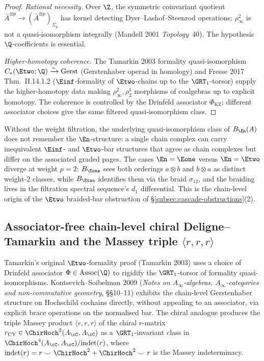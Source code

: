 \begin{proof}
\emph{Rational necessity.} Over $\Z$, the symmetric coinvariant quotient $\bar A^{\otimes p} \to (\bar A^{\otimes p})_{\Sigma_p}$ has kernel detecting Dyer--Lashof--Steenrod operations; $\rho_\infty^2$ is not a quasi-isomorphism integrally (Mandell 2001 \emph{Topology}~40). The hypothesis $\Q$-coefficients is essential.

\emph{Higher-homotopy coherence.} The Tamarkin 2003 formality quasi-isomorphism $C_*(\Etwo; \Q) \xrightarrow{\sim} \Gerst$ (Gerstenhaber operad in homology) and Fresse 2017 Thm.~II.14.1.2 ($\Einf$-formality of $\Etwo$-chains up to the $\GRT_1$-torsor) supply the higher-homotopy data making $\rho_\infty^2, \rho_2^1$ morphisms of coalgebras up to explicit homotopy. The coherence is controlled by the Drinfeld associator $\Phi_{\mathrm{KZ}}$; different associator choices give the same filtered quasi-isomorphism class.
\qedhere
\end{proof}

\begin{remark}
\label{rem:filtration-essential}
Without the weight filtration, the underlying quasi-isomorphism class of $B_{\En}(A)$ does not remember the $\En$-structure: a single chain complex can carry inequivalent $\Einf$- and $\Etwo$-bar structures that agree as chain complexes but differ on the associated graded pages. The cases $\En = \Eone$ versus $\En = \Etwo$ diverge at weight $p = 2$: $B_{\Eone}$ sees both orderings $a \otimes b$ and $b \otimes a$ as distinct weight-$2$ classes, while $B_{\Etwo}$ identifies them via the braid $\sigma_{12}$, and the braiding lives in the filtration spectral sequence's $d_1$ differential. This is the chain-level origin of the $\Etwo$ braided-bar obstruction of \S\ref{subsec:cascade-obstructions}(2).
\end{remark}

\subsection{Associator-free chain-level chiral Deligne--Tamarkin and the Massey triple \texorpdfstring{$\langle r, r, r\rangle$}{<r, r, r>}}
\label{subsec:associator-free-deligne-tamarkin}

Tamarkin's original $\Etwo$-formality proof (Tamarkin 2003) uses a choice of Drinfeld associator $\Phi \in \Assoc(\Q)$ to rigidify the $\GRT_1$-torsor of formality quasi-isomorphisms. Kontsevich--Soibelman 2009 (\emph{Notes on $A_\infty$-algebras, $A_\infty$-categories and non-commutative geometry}, \S\S 10--11) exhibits the chain-level Gerstenhaber structure on Hochschild cochains directly, without appealing to an associator, via explicit brace operations on the normalised bar. The chiral analogue produces the triple Massey product $\langle r, r, r\rangle$ of the chiral $r$-matrix $r_{\mathrm{CY}} \in \ChirHoch^2(A_\cC, A_\cC)$ as a $\GRT_1$-invariant class in $\ChirHoch^4(A_\cC, A_\cC)/\mathrm{indet}(r)$, where $\mathrm{indet}(r) = r \smile \ChirHoch^2 + \ChirHoch^2 \smile r$ is the Massey indeterminacy.

